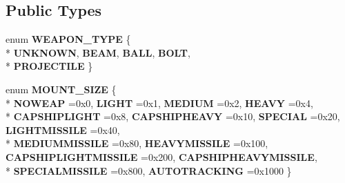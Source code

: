 \subsection*{Public Types}
\begin{DoxyCompactItemize}
\item 
enum {\bfseries W\+E\+A\+P\+O\+N\+\_\+\+T\+Y\+PE} \{ \\*
{\bfseries U\+N\+K\+N\+O\+WN}, 
{\bfseries B\+E\+AM}, 
{\bfseries B\+A\+LL}, 
{\bfseries B\+O\+LT}, 
\\*
{\bfseries P\+R\+O\+J\+E\+C\+T\+I\+LE}
 \}\hypertarget{structweapon__info_a61db6bc8fac5dace3ff50b14fac07026}{}\label{structweapon__info_a61db6bc8fac5dace3ff50b14fac07026}

\item 
enum {\bfseries M\+O\+U\+N\+T\+\_\+\+S\+I\+ZE} \{ \\*
{\bfseries N\+O\+W\+E\+AP} =0x0, 
{\bfseries L\+I\+G\+HT} =0x1, 
{\bfseries M\+E\+D\+I\+UM} =0x2, 
{\bfseries H\+E\+A\+VY} =0x4, 
\\*
{\bfseries C\+A\+P\+S\+H\+I\+P\+L\+I\+G\+HT} =0x8, 
{\bfseries C\+A\+P\+S\+H\+I\+P\+H\+E\+A\+VY} =0x10, 
{\bfseries S\+P\+E\+C\+I\+AL} =0x20, 
{\bfseries L\+I\+G\+H\+T\+M\+I\+S\+S\+I\+LE} =0x40, 
\\*
{\bfseries M\+E\+D\+I\+U\+M\+M\+I\+S\+S\+I\+LE} =0x80, 
{\bfseries H\+E\+A\+V\+Y\+M\+I\+S\+S\+I\+LE} =0x100, 
{\bfseries C\+A\+P\+S\+H\+I\+P\+L\+I\+G\+H\+T\+M\+I\+S\+S\+I\+LE} =0x200, 
{\bfseries C\+A\+P\+S\+H\+I\+P\+H\+E\+A\+V\+Y\+M\+I\+S\+S\+I\+LE}, 
\\*
{\bfseries S\+P\+E\+C\+I\+A\+L\+M\+I\+S\+S\+I\+LE} =0x800, 
{\bfseries A\+U\+T\+O\+T\+R\+A\+C\+K\+I\+NG} =0x1000
 \}\hypertarget{structweapon__info_a8edae49a7871dafa5d90f31c3e6e0b21}{}\label{structweapon__info_a8edae49a7871dafa5d90f31c3e6e0b21}

\end{DoxyCompactItemize}
